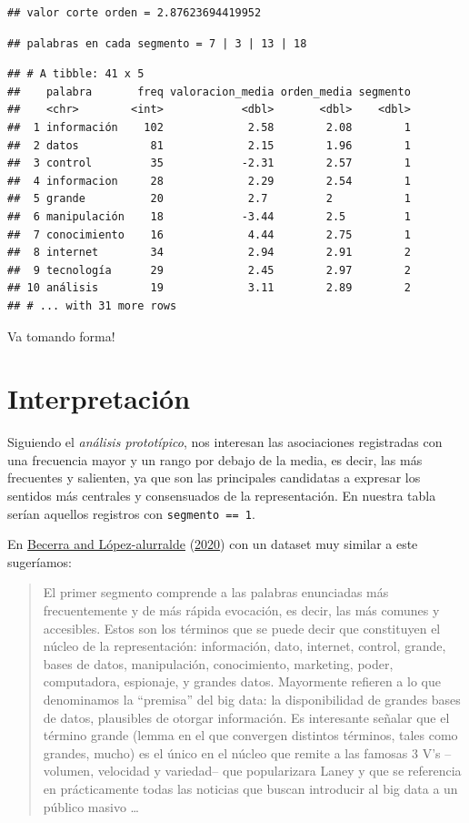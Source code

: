 \documentclass[
]{book}
\begin{document}
\begin{verbatim}
## valor corte orden = 2.87623694419952
\end{verbatim}

\begin{verbatim}
## palabras en cada segmento = 7 | 3 | 13 | 18
\end{verbatim}

\begin{verbatim}
## # A tibble: 41 x 5
##    palabra       freq valoracion_media orden_media segmento
##    <chr>        <int>            <dbl>       <dbl>    <dbl>
##  1 información    102             2.58        2.08        1
##  2 datos           81             2.15        1.96        1
##  3 control         35            -2.31        2.57        1
##  4 informacion     28             2.29        2.54        1
##  5 grande          20             2.7         2           1
##  6 manipulación    18            -3.44        2.5         1
##  7 conocimiento    16             4.44        2.75        1
##  8 internet        34             2.94        2.91        2
##  9 tecnología      29             2.45        2.97        2
## 10 análisis        19             3.11        2.89        2
## # ... with 31 more rows
\end{verbatim}

Va tomando forma!

\hypertarget{interpretaciuxf3n}{%
\section{Interpretación}\label{interpretaciuxf3n}}

Siguiendo el \emph{análisis prototípico}, nos interesan las asociaciones registradas con una frecuencia mayor y un rango por debajo de la media, es decir, las más frecuentes y salienten, ya que son las principales candidatas a expresar los sentidos más centrales y consensuados de la representación. En nuestra tabla serían aquellos registros con \texttt{segmento\ ==\ 1}.

En \protect\hyperlink{ref-Becerra2020}{Becerra and López-alurralde} (\protect\hyperlink{ref-Becerra2020}{2020}) con un dataset muy similar a este sugeríamos:

\begin{quote}
El primer segmento comprende a las palabras enunciadas más frecuentemente y de más rápida evocación, es decir, las más comunes y accesibles. Estos son los términos que se puede decir que constituyen el núcleo de la representación: información, dato, internet, control, grande, bases de datos, manipulación, conocimiento, marketing, poder, computadora, espionaje, y grandes datos. Mayormente refieren a lo que denominamos la ``premisa'' del big data: la disponibilidad de grandes bases de datos, plausibles de otorgar información. Es interesante señalar que el término grande (lemma en el que convergen distintos términos, tales como grandes, mucho) es el único en el núcleo que remite a las famosas 3 V's --volumen, velocidad y variedad-- que popularizara Laney y que se referencia en prácticamente todas las noticias que buscan introducir al big data a un público masivo \ldots{}
\end{quote}
\end{document}
